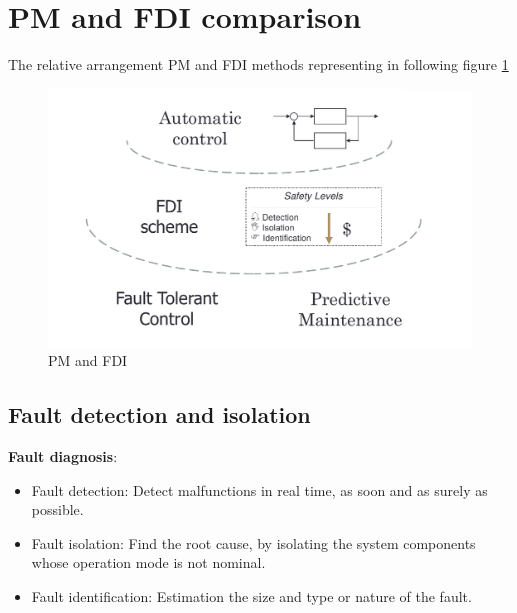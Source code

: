 \documentclass[class=article, crop=false]{standalone}
\begin{document}
\section{PM and FDI comparison}

The relative arrangement PM and FDI methods representing in following
figure \ref{fig:fdi_pm}
\begin{figure}[h!]
    \centering
    \includegraphics[scale=0.3]{FDI_PM.png}
    \caption{PM and FDI }
    \label{fig:fdi_pm}
\end{figure}

\subsection{Fault detection and isolation}



 
\textbf{Fault diagnosis}:
\begin{itemize}
    \item{Fault detection: Detect malfunctions in real time, as soon and as
        surely as possible.}
    \item{Fault isolation: Find the root cause, by isolating the system
        components whose operation mode is not nominal.}
    \item{Fault identification: Estimation the size and type or nature of the
        fault.}
\end{itemize}
\end{document}

